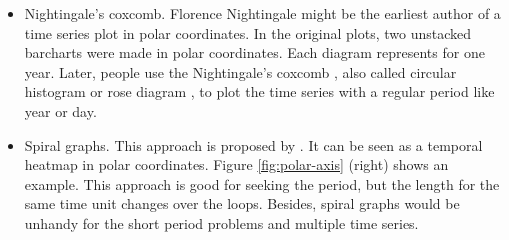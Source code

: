 \documentclass[12pt]{article}
\begin{document}

\begin{itemize} \itemsep 0in
\item Nightingale's coxcomb. Florence Nightingale might be the earliest
author of a time series plot in polar coordinates. In the original
plots, two unstacked barcharts were made in polar coordinates. Each
diagram represents for one year. Later, people use the Nightingale's
coxcomb \citep{nightingale1858notes}, also called circular histogram
or rose diagram \citep{nemec1988shape}, to plot the time series with
a regular period like year or day.
\item Spiral graphs. This approach is proposed by \citet{weber2001visualizing}.
It can be seen as a temporal heatmap in polar coordinates. Figure
\ref{fig:polar-axis} (right) shows an example. This approach
is good for seeking the period, but the length for the same time unit
changes over the loops. Besides, spiral graphs would be unhandy for
the short period problems and multiple time series.
\end{itemize}
\end{document}
